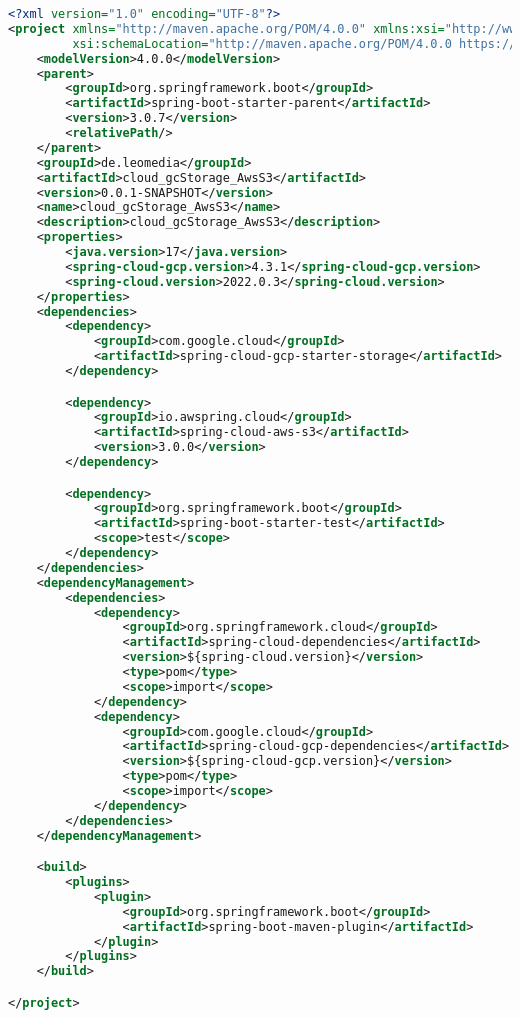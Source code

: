 \begin{lstlisting}[language=XML, caption=pom.xml - Abhängigkeiten des Prototyps]
	<?xml version="1.0" encoding="UTF-8"?>
<project xmlns="http://maven.apache.org/POM/4.0.0" xmlns:xsi="http://www.w3.org/2001/XMLSchema-instance"
         xsi:schemaLocation="http://maven.apache.org/POM/4.0.0 https://maven.apache.org/xsd/maven-4.0.0.xsd">
    <modelVersion>4.0.0</modelVersion>
    <parent>
        <groupId>org.springframework.boot</groupId>
        <artifactId>spring-boot-starter-parent</artifactId>
        <version>3.0.7</version>
        <relativePath/>
    </parent>
    <groupId>de.leomedia</groupId>
    <artifactId>cloud_gcStorage_AwsS3</artifactId>
    <version>0.0.1-SNAPSHOT</version>
    <name>cloud_gcStorage_AwsS3</name>
    <description>cloud_gcStorage_AwsS3</description>
    <properties>
        <java.version>17</java.version>
        <spring-cloud-gcp.version>4.3.1</spring-cloud-gcp.version>
        <spring-cloud.version>2022.0.3</spring-cloud.version>
    </properties>
    <dependencies>
        <dependency>
            <groupId>com.google.cloud</groupId>
            <artifactId>spring-cloud-gcp-starter-storage</artifactId>
        </dependency>

        <dependency>
            <groupId>io.awspring.cloud</groupId>
            <artifactId>spring-cloud-aws-s3</artifactId>
            <version>3.0.0</version>
        </dependency>

        <dependency>
            <groupId>org.springframework.boot</groupId>
            <artifactId>spring-boot-starter-test</artifactId>
            <scope>test</scope>
        </dependency>
    </dependencies>
    <dependencyManagement>
        <dependencies>
            <dependency>
                <groupId>org.springframework.cloud</groupId>
                <artifactId>spring-cloud-dependencies</artifactId>
                <version>${spring-cloud.version}</version>
                <type>pom</type>
                <scope>import</scope>
            </dependency>
            <dependency>
                <groupId>com.google.cloud</groupId>
                <artifactId>spring-cloud-gcp-dependencies</artifactId>
                <version>${spring-cloud-gcp.version}</version>
                <type>pom</type>
                <scope>import</scope>
            </dependency>
        </dependencies>
    </dependencyManagement>

    <build>
        <plugins>
            <plugin>
                <groupId>org.springframework.boot</groupId>
                <artifactId>spring-boot-maven-plugin</artifactId>
            </plugin>
        </plugins>
    </build>

</project>

\end{lstlisting}


